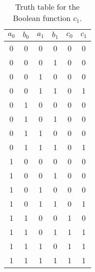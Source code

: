 \documentclass[a4paper,11pt]{kth-mag}
\begin{document}
\begin{table}
\centering
\begin{tabular}{cccc|cc}
$a_0$ & $b_0$ & $a_1$ & $b_1$ & $c_0$ & $c_1$ \\
\hline
0     & 0     & 0     & 0     & 0     & 0 \\
0     & 0     & 0     & 1     & 0     & 0 \\
0     & 0     & 1     & 0     & 0     & 0 \\
0     & 0     & 1     & 1     & 0     & 1 \\
0     & 1     & 0     & 0     & 0     & 0 \\
0     & 1     & 0     & 1     & 0     & 0 \\
0     & 1     & 1     & 0     & 0     & 0 \\
0     & 1     & 1     & 1     & 0     & 1 \\
1     & 0     & 0     & 0     & 0     & 0 \\
1     & 0     & 0     & 1     & 0     & 0 \\
1     & 0     & 1     & 0     & 0     & 0 \\
1     & 0     & 1     & 1     & 0     & 1 \\
1     & 1     & 0     & 0     & 1     & 0 \\
1     & 1     & 0     & 1     & 1     & 1 \\
1     & 1     & 1     & 0     & 1     & 1 \\
1     & 1     & 1     & 1     & 1     & 1 \\
\end{tabular}
\caption{Truth table for the Boolean function $c_1$.}
\label{tab:tt_c1}
\end{table}
\end{document}
